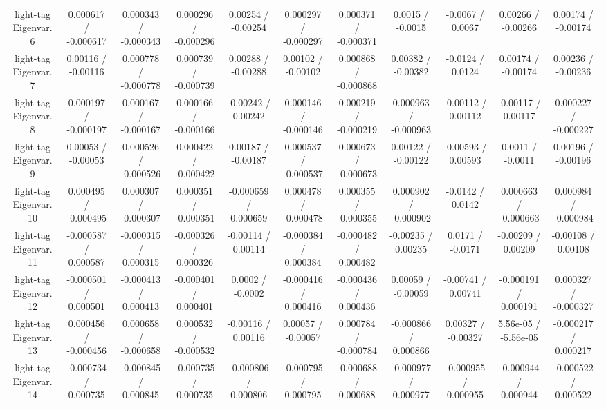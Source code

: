 \begin{table}[htbp]
\begin{center}
\begin{tabular}{|c|c|c|c|c|c|c|c|c|c|c|}
  light-tag Eigenvar. 6 & 0.000617 / -0.000617 & 0.000343 / -0.000343 & 0.000296 / -0.000296 & 0.00254 / -0.00254 & 0.000297 / -0.000297 & 0.000371 / -0.000371 & 0.0015 / -0.0015 & -0.0067 / 0.0067 & 0.00266 / -0.00266 & 0.00174 / -0.00174 \\ 
  light-tag Eigenvar. 7 & 0.00116 / -0.00116 & 0.000778 / -0.000778 & 0.000739 / -0.000739 & 0.00288 / -0.00288 & 0.00102 / -0.00102 & 0.000868 / -0.000868 & 0.00382 / -0.00382 & -0.0124 / 0.0124 & 0.00174 / -0.00174 & 0.00236 / -0.00236 \\ 
  light-tag Eigenvar. 8 & 0.000197 / -0.000197 & 0.000167 / -0.000167 & 0.000166 / -0.000166 & -0.00242 / 0.00242 & 0.000146 / -0.000146 & 0.000219 / -0.000219 & 0.000963 / -0.000963 & -0.00112 / 0.00112 & -0.00117 / 0.00117 & 0.000227 / -0.000227 \\ 
  light-tag Eigenvar. 9 & 0.00053 / -0.00053 & 0.000526 / -0.000526 & 0.000422 / -0.000422 & 0.00187 / -0.00187 & 0.000537 / -0.000537 & 0.000673 / -0.000673 & 0.00122 / -0.00122 & -0.00593 / 0.00593 & 0.0011 / -0.0011 & 0.00196 / -0.00196 \\ 
  light-tag Eigenvar. 10 & 0.000495 / -0.000495 & 0.000307 / -0.000307 & 0.000351 / -0.000351 & -0.000659 / 0.000659 & 0.000478 / -0.000478 & 0.000355 / -0.000355 & 0.000902 / -0.000902 & -0.0142 / 0.0142 & 0.000663 / -0.000663 & 0.000984 / -0.000984 \\ 
  light-tag Eigenvar. 11 & -0.000587 / 0.000587 & -0.000315 / 0.000315 & -0.000326 / 0.000326 & -0.00114 / 0.00114 & -0.000384 / 0.000384 & -0.000482 / 0.000482 & -0.00235 / 0.00235 & 0.0171 / -0.0171 & -0.00209 / 0.00209 & -0.00108 / 0.00108 \\ 
  light-tag Eigenvar. 12 & -0.000501 / 0.000501 & -0.000413 / 0.000413 & -0.000401 / 0.000401 & 0.0002 / -0.0002 & -0.000416 / 0.000416 & -0.000436 / 0.000436 & 0.00059 / -0.00059 & -0.00741 / 0.00741 & -0.000191 / 0.000191 & 0.000327 / -0.000327 \\ 
  light-tag Eigenvar. 13 & 0.000456 / -0.000456 & 0.000658 / -0.000658 & 0.000532 / -0.000532 & -0.00116 / 0.00116 & 0.00057 / -0.00057 & 0.000784 / -0.000784 & -0.000866 / 0.000866 & 0.00327 / -0.00327 & 5.56e-05 / -5.56e-05 & -0.000217 / 0.000217 \\ 
  light-tag Eigenvar. 14 & -0.000734 / 0.000735 & -0.000845 / 0.000845 & -0.000735 / 0.000735 & -0.000806 / 0.000806 & -0.000795 / 0.000795 & -0.000688 / 0.000688 & -0.000977 / 0.000977 & -0.000955 / 0.000955 & -0.000944 / 0.000944 & -0.000522 / 0.000522 \\ 

\end{tabular}
\end{center}
\end{table}

